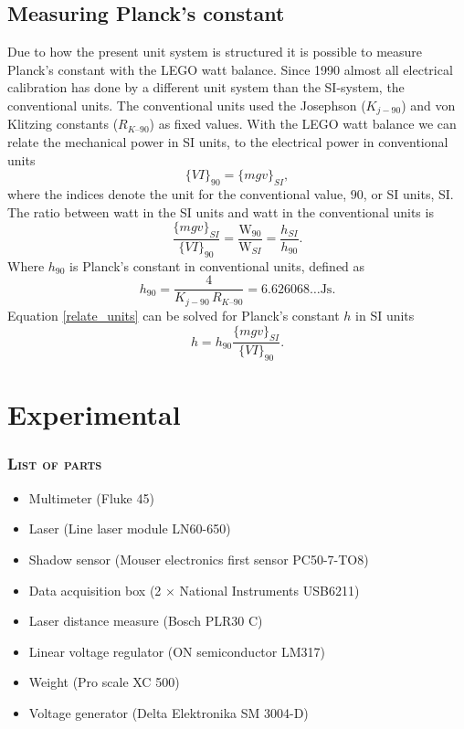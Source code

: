 \documentclass[english,a4paper,12pt,reprint]{revtex4-1}
\begin{document}
\subsection{Measuring Planck's constant}
Due to how the present unit system is structured it is possible to measure Planck's constant with the LEGO watt balance. Since 1990 almost all electrical calibration has done by a different unit system than the SI-system, the conventional units. The conventional units used the Josephson ($K_{j-90}$) and von Klitzing constants ($R_{K–90}$) as fixed values. With the LEGO watt balance we can relate the mechanical power in SI units, to the electrical power in conventional units
\begin{equation*}
    \{VI\}_{90} = \{mgv\}_{SI},
\end{equation*}
where the indices denote the unit for the conventional value, $90$, or SI units, SI. The ratio between watt in the SI units and watt in the conventional units is
\begin{equation}
    \frac{\{mgv\}_{SI}}{ \{VI\}_{90}} = \frac{\text{W}_{90}}{\text{W}_{SI}} = \frac{h_{SI}}{h_{90}} \label{relate_units}.
\end{equation}
Where $h_{90}$ is Planck's constant in conventional units, defined as \begin{equation}
    h_{90} = \frac{4}{K_{j-90}\,R_{K–90}} = 6.626068\ldots\text{Js}.
\end{equation}
Equation \eqref{relate_units} can be solved for Planck's constant $h$ in SI units
\begin{equation}
    h = h_{90}\frac{\{mgv\}_{SI}}{ \{VI\}_{90}}. \label{planck}
\end{equation}


\section{Experimental}
\subsubsection*{\textsc{List of parts}}
\begin{itemize}
  \item Multimeter (Fluke 45)
  \item Laser (Line laser module LN60-650)
  \item Shadow sensor  (Mouser electronics first sensor PC50-7-TO8)
  \item Data acquisition box (2 $\times$ National Instruments USB6211)
  \item Laser distance measure (Bosch PLR30 C)
  \item Linear voltage regulator (ON semiconductor LM317)
  \item Weight  (Pro scale XC 500)
  \item Voltage generator (Delta Elektronika SM 3004-D)

\end{itemize}
\end{document}
